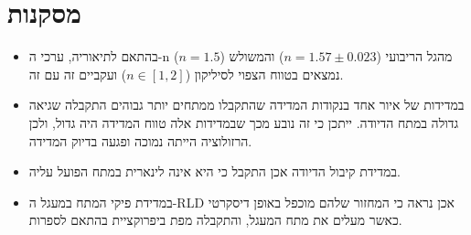 \documentclass[11pt]{article}
\begin{document}
\section*{מסקנות}
\begin{itemize}\setlength{\itemsep}{1pt}\setlength{\parsep}{0pt}
  \item בהתאם לתיאוריה, ערכי ה-n מהגל הריבועי ($n = 1.57 \pm 0.023$) והמשולש ($n = 1.5$) נמצאים בטווח הצפוי לסיליקון ($n \in [1,2]$) ועקביים זה עם זה.
  \item במדידות של איור אחד בנקודות המדידה שהתקבלו ממתחים יותר גבוהים התקבלה שגיאה גדולה במתח הדיודה. ייתכן כי זה נובע מכך שבמדידות אלה טווח המדידה היה גדול, ולכן הרזולוציה הייתה נמוכה ופגעה בדיוק המדידה. 
  \item במדידת קיבול הדיודה אכן התקבל כי היא אינה לינארית במתח הפועל עליה.
  \item במדידת פיקי המתח במעגל ה-RLD אכן נראה כי המחזור שלהם מוכפל באופן דיסקרטי כאשר מעלים את מתח המעגל, והתקבלה מפת ביפרוקציית בהתאם לספרות.


\end{itemize}
\end{document}
